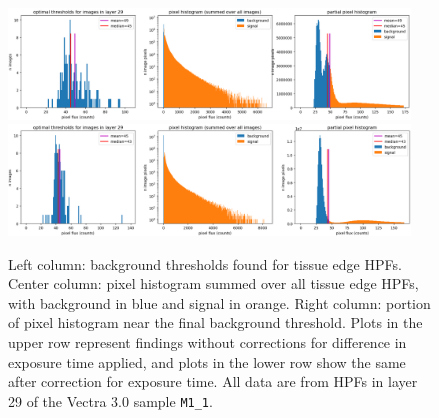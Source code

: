\documentclass[letterpaper,11pt]{article}
\begin{document}
\begin{figure}[!ht]
\centering
\includegraphics[width=0.95\textwidth]{images/results/thresholding_pre_correction/M54_1_layer_29_background_threshold_plots}
\includegraphics[width=0.95\textwidth]{images/results/thresholding_post_correction/M54_1_layer_29_background_threshold_plots}
\caption{\footnotesize Left column: background thresholds found for tissue edge HPFs. Center column: pixel histogram summed over all tissue edge HPFs, with background in blue and signal in orange. Right column: portion of pixel histogram near the final background threshold. Plots in the upper row represent findings without corrections for difference in exposure time applied, and plots in the lower row show the same after correction for exposure time. All data are from HPFs in layer 29 of the Vectra 3.0 sample \texttt{M1\_1}.}
\label{fig:background_threshold_impact_vectra_layer_29}
\end{figure}
\end{document}
